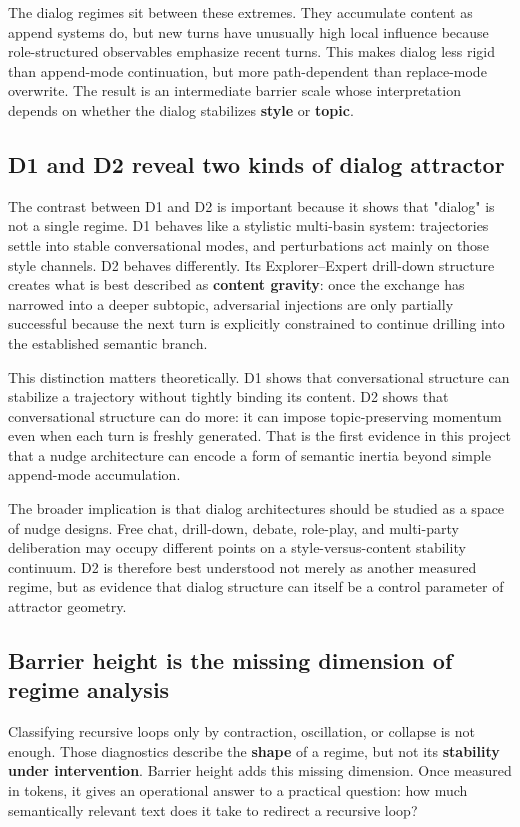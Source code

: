 \documentclass{article}
\theoremstyle{plain}
\theoremstyle{definition}
\begin{document}
The dialog regimes sit between these extremes. They accumulate
content as append systems do, but new turns have unusually high local
influence because role-structured observables emphasize recent turns.
This makes dialog less rigid than append-mode continuation, but more
path-dependent than replace-mode overwrite. The result is an
intermediate barrier scale whose interpretation depends on whether
the dialog stabilizes \textbf{style} or \textbf{topic}.

\subsection{D1 and D2 reveal two kinds of dialog attractor}

The contrast between D1 and D2 is important because it shows that
"dialog" is not a single regime. D1 behaves like a stylistic
multi-basin system: trajectories settle into stable conversational
modes, and perturbations act mainly on those style channels. D2
behaves differently. Its Explorer–Expert drill-down structure creates
what is best described as \textbf{content gravity}: once the exchange has
narrowed into a deeper subtopic, adversarial injections are only
partially successful because the next turn is explicitly constrained
to continue drilling into the established semantic branch.

This distinction matters theoretically. D1 shows that conversational
structure can stabilize a trajectory without tightly binding its
content. D2 shows that conversational structure can do more: it can
impose topic-preserving momentum even when each turn is freshly
generated. That is the first evidence in this project that a nudge
architecture can encode a form of semantic inertia beyond simple
append-mode accumulation.

The broader implication is that dialog architectures should be
studied as a space of nudge designs. Free chat, drill-down, debate,
role-play, and multi-party deliberation may occupy different points
on a style-versus-content stability continuum. D2 is therefore best
understood not merely as another measured regime, but as evidence
that dialog structure can itself be a control parameter of attractor
geometry.

\subsection{Barrier height is the missing dimension of regime analysis}

Classifying recursive loops only by contraction, oscillation, or
collapse is not enough. Those diagnostics describe the \textbf{shape} of
a regime, but not its \textbf{stability under intervention}. Barrier
height adds this missing dimension. Once measured in tokens, it
gives an operational answer to a practical question: how much
semantically relevant text does it take to redirect a recursive
loop?
\end{document}
